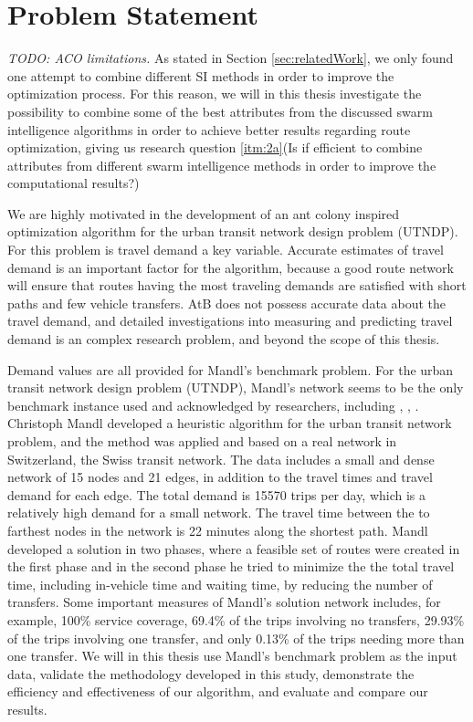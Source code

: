 \section{Problem Statement}
\emph{\color{blue}TODO: ACO limitations.} As stated in Section \vref{sec:relatedWork}, we only found one attempt to combine different SI methods in order to improve the optimization process. For this reason, we will in this thesis investigate the possibility to combine some of the best attributes from the discussed swarm intelligence algorithms in order to achieve better results regarding route optimization, giving us research question \vref{itm:2a}(Is if efficient to combine attributes from different swarm intelligence methods in order to improve the computational results?)

We are highly motivated in the development of an ant colony inspired optimization algorithm for the urban transit network design problem (UTNDP). For this problem is travel demand a key variable. Accurate estimates of travel demand is an important factor for the algorithm, because a good route network will ensure that routes having the most traveling demands are satisfied with short paths and few vehicle transfers. AtB does not possess accurate data about the travel demand, and detailed investigations into measuring and predicting travel demand is an complex research problem, and beyond the scope of this thesis. 

Demand values are all provided for Mandl's benchmark problem. For the urban transit network design problem (UTNDP), Mandl's network seems to be the only benchmark instance used and acknowledged by researchers, including \citep{fan09}, \citep{kechagiopoulos14}, \citep{nikolic14}. Christoph Mandl \citep{mandl79} developed a heuristic algorithm for the urban transit network problem, and the method was applied and based on a real network in Switzerland, the Swiss transit network\citep{mandl80}. The data includes a small and dense network of 15 nodes and 21 edges, in addition to the travel times and travel demand for each edge. The total demand is 15570 trips per day, which is a relatively high demand for a small network. The travel time between the to farthest nodes in the network is 22 minutes along the shortest path. Mandl developed a solution in two phases, where a feasible set of routes were created in the first phase and in the second phase he tried to minimize the the total travel time, including in-vehicle time and waiting time, by reducing the number of transfers. Some important measures of Mandl's solution network includes, for example, 100\% service coverage, 69.4\% of the trips involving no transfers, 29.93\% of the trips involving one transfer, and only 0.13\% of the trips needing more than one transfer. We will in this thesis use Mandl's benchmark problem \citep{mandl79} as the input data, validate the methodology developed in this study, demonstrate the efficiency and effectiveness of our algorithm, and evaluate and compare our results. 

